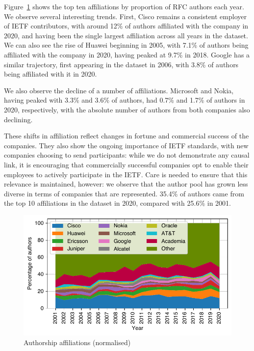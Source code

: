 \documentclass[twocolumn,10pt]{article}
\newlength{\figureWidthOneColumn}
\newcommand{\pb}[1]{\vspace{0.75ex}\noindent{\textbf{#1}}}
\begin{document}
\pb{Corporate Authors:}
Figure~\ref{fig:author_affiliations_normalised} shows the top ten
affiliations by proportion of RFC authors each year. We observe several
interesting trends.  First, Cisco remains a consistent employer of IETF
contributors, with around 12\% of authors affiliated with the company in
2020, and having been the single largest affiliation across all years in
the dataset. We can also see the rise of Huawei beginning in 2005, with
7.1\% of authors being affiliated with the company in 2020, having peaked
at 9.7\% in 2018. Google has a similar trajectory, first appearing in the
dataset in 2006, with 3.8\% of authors being affiliated with it in 2020.

We also observe the decline of a number of affiliations.  Microsoft and
Nokia, having peaked with 3.3\% and 3.6\% of authors, had 0.7\% and 1.7\%
of authors in 2020, respectively, with the absolute number of authors from
both companies also declining.

These shifts in affiliation reflect changes in fortune and commercial
success of the companies. They also show the ongoing importance of IETF
standards, with new companies choosing to send participants: while we do
not demonstrate any causal link, it is encouraging that commercially
successful companies opt to enable their employees to actively participate
in the IETF. Care is needed to ensure that this relevance is maintained,
however: we observe that the author pool has grown less diverse in terms of
companies that are represented. 35.4\% of authors came from the top 10
affiliations in the dataset in 2020, compared with 25.6\% in 2001. 


\begin{figure}
  \centering
  \includegraphics[width=\figureWidthOneColumn]{figures-prev/imc-2021/authors/top5_affiliations_normalised.pdf}
  \caption{
    Authorship affiliations (normalised)
  }
  \label{fig:author_affiliations_normalised}
\end{figure}
\end{document}
